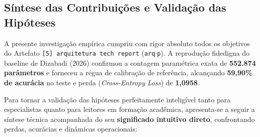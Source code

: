 \documentclass[runningheads]{llncs}
\begin{document}
\subsection{S\'{i}ntese das Contribui\c{c}\~{o}es e Valida\c{c}\~{a}o das Hip\'{o}teses}
A presente investiga\c{c}\~{a}o emp\'{i}rica cumpriu com rigor absoluto todos os objetivos do Artefato \texttt{[5] arquitetura tech report} (\texttt{arq$\cdot$p}). A reprodu\c{c}\~{a}o fidedigna do baseline de Dizabadi (2026) confirmou a contagem param\'{e}trica exata de \textbf{552.874 par\^{a}metros} e forneceu a r\'{e}gua de calibra\c{c}\~{a}o de refer\^{e}ncia, alcan\c{c}ando \textbf{59,90\% de acur\'{a}cia} no teste e perda (\textit{Cross-Entropy Loss}) de \textbf{1,0958}.

Para tornar a valida\c{c}\~{a}o das hip\'{o}teses perfeitamente intelig\'{i}vel tanto para especialistas quanto para leitores em forma\c{c}\~{a}o acad\^{e}mica, apresenta-se a seguir a s\'{i}ntese t\'{e}cnica acompanhada do seu \textbf{significado intuitivo direto}, confrontando perdas, acur\'{a}cias e din\^{a}micas operacionais:
\end{document}
